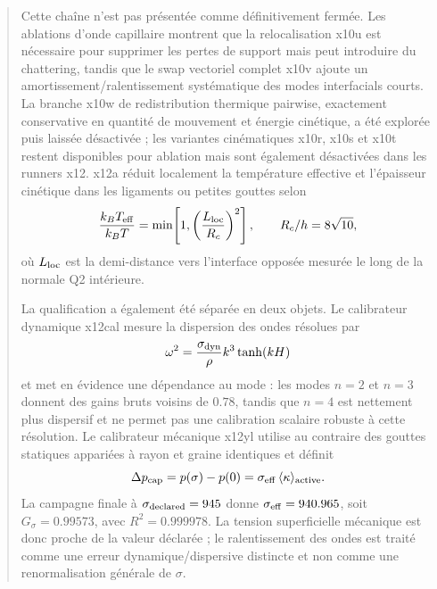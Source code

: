 \documentclass[11pt,a4paper]{article}
\begin{document}
\begin{abstract}
Cette chaîne n'est pas présentée comme définitivement fermée. Les ablations d'onde capillaire montrent que la relocalisation x10u est nécessaire pour supprimer les pertes de support mais peut introduire du chattering, tandis que le swap vectoriel complet x10v ajoute un amortissement/ralentissement systématique des modes interfacials courts. La branche x10w de redistribution thermique pairwise, exactement conservative en quantité de mouvement et énergie cinétique, a été explorée puis laissée désactivée ; les variantes cinématiques x10r, x10s et x10t restent disponibles pour ablation mais sont également désactivées dans les runners x12. x12a réduit localement la température effective et l'épaisseur cinétique dans les ligaments ou petites gouttes selon
\[
  \frac{k_BT_{\rm eff}}{k_BT}
  =\min\!\left[1,\left(\frac{L_{\rm loc}}{R_c}\right)^2\right],
  \qquad R_c/h=8\sqrt{10},
\]
où $L_{\rm loc}$ est la demi-distance vers l'interface opposée mesurée le long de la normale Q2 intérieure.

La qualification a également été séparée en deux objets. Le calibrateur dynamique x12cal mesure la dispersion des ondes résolues par
\[
  \omega^2=\frac{\sigma_{\rm dyn}}{\rho}k^3\tanh(kH)
\]
et met en évidence une dépendance au mode : les modes $n=2$ et $n=3$ donnent des gains bruts voisins de $0.78$, tandis que $n=4$ est nettement plus dispersif et ne permet pas une calibration scalaire robuste à cette résolution. Le calibrateur mécanique x12yl utilise au contraire des gouttes statiques appariées à rayon et graine identiques et définit
\[
  \Delta p_{\rm cap}=p(\sigma)-p(0)
  =\sigma_{\rm eff}\,\langle\kappa\rangle_{\rm active}.
\]
La campagne finale à $\sigma_{\rm declared}=945$ donne $\sigma_{\rm eff}=940.965$, soit $G_\sigma=0.99573$, avec $R^2=0.999978$. La tension superficielle mécanique est donc proche de la valeur déclarée ; le ralentissement des ondes est traité comme une erreur dynamique/dispersive distincte et non comme une renormalisation générale de $\sigma$.


\end{abstract}
\end{document}
